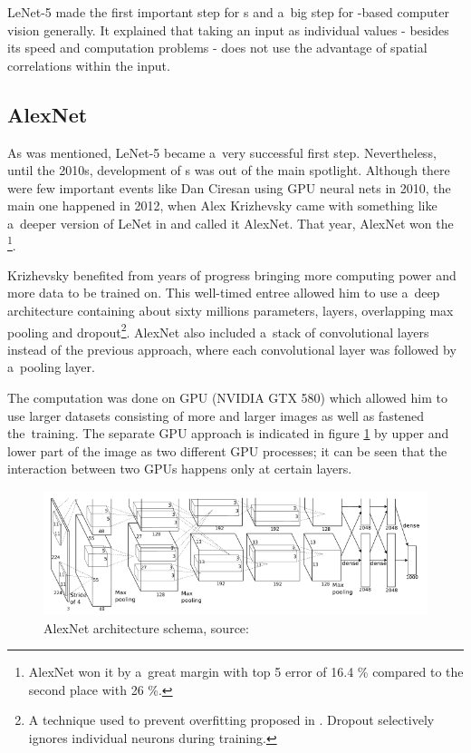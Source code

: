 LeNet-5 made the first important step for s and a~big step for 
-based computer vision generally. It explained that taking an input as 
individual values - besides its speed and computation problems - does not use 
the advantage of spatial correlations within the input. 



\subsection{AlexNet} %
\label{alexnet}

As was mentioned, LeNet-5 became a~very successful first step. Nevertheless,
until the 2010s, development of s was out of the main spotlight.
Although there were few important events like Dan Ciresan using GPU neural nets
in 2010, the main one happened in 2012, when Alex Krizhevsky came with
something like a~deeper version of LeNet in \cite{cnn-classification} and
called it AlexNet. That year, AlexNet won the \footnote{AlexNet won
it by a~great margin with top 5 error of 16.4 \% compared to the second place
with 26 \%.}.

Krizhevsky benefited from years of progress bringing more computing power and 
more data to be trained on. This well-timed entree allowed him to use a~deep 
architecture containing about sixty millions parameters,  layers, 
overlapping max pooling and dropout\footnote{A technique used to prevent 
overfitting proposed in \cite{dropout}. Dropout selectively ignores individual 
neurons during training.}. AlexNet also included a~stack of convolutional
layers instead of the previous approach, where each convolutional layer was
followed by a~pooling layer. 

The computation was done on GPU (NVIDIA GTX 580) which allowed him to use
larger datasets consisting of more and larger images as well as fastened
the~training. The separate GPU approach is indicated in figure
\ref{fig:alexnet} by upper and lower part of the image as two different GPU
processes; it can be seen that the interaction between two GPUs happens only at
certain layers. 

\begin{figure}[H]
   \centering
	\includegraphics[width=\linewidth]{./pictures/alexnet.png}
	\caption[AlexNet architecture]{AlexNet architecture schema, source: 
	\cite{cnn-classification}}
      \label{fig:alexnet}
\end{figure}

